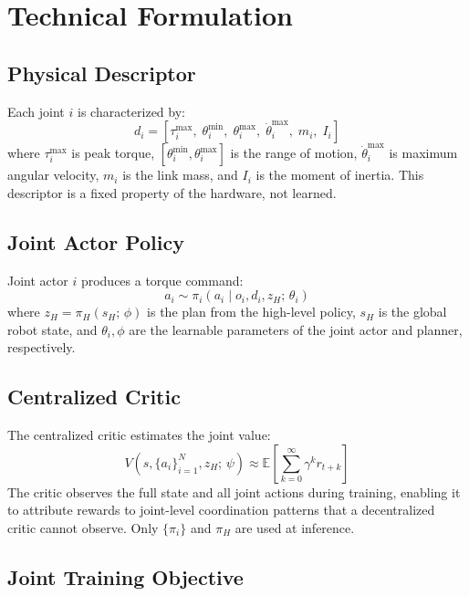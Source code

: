 \documentclass[10pt,twocolumn]{article}
\begin{document}
\section{Technical Formulation}

\subsection*{Physical Descriptor}

Each joint $i$ is characterized by:
\begin{equation}
d_i = [\tau^{\max}_i,\;\theta^{\min}_i,\;\theta^{\max}_i,\;\dot{\theta}^{\max}_i,\;m_i,\;I_i]
\end{equation}
where $\tau^{\max}_i$ is peak torque, $[\theta^{\min}_i, \theta^{\max}_i]$ is the range of motion, $\dot{\theta}^{\max}_i$ is maximum angular velocity, $m_i$ is the link mass, and $I_i$ is the moment of inertia.
This descriptor is a fixed property of the hardware, not learned.

\subsection*{Joint Actor Policy}

Joint actor $i$ produces a torque command:
\begin{equation}
a_i \sim \pi_i(a_i \mid o_i, d_i, z_H;\,\theta_i)
\end{equation}
where $z_H = \pi_H(s_H;\,\phi)$ is the plan from the high-level policy, $s_H$ is the global robot state, and $\theta_i, \phi$ are the learnable parameters of the joint actor and planner, respectively.

\subsection*{Centralized Critic}

The centralized critic estimates the joint value:
\begin{equation}
V(s, \{a_i\}_{i=1}^{N}, z_H;\,\psi) \approx \mathbb{E}\!\left[\sum_{k=0}^\infty \gamma^k r_{t+k}\right]
\end{equation}
The critic observes the full state and all joint actions during training, enabling it to attribute rewards to joint-level coordination patterns that a decentralized critic cannot observe.
Only $\{\pi_i\}$ and $\pi_H$ are used at inference.

\subsection*{Joint Training Objective}
\end{document}
